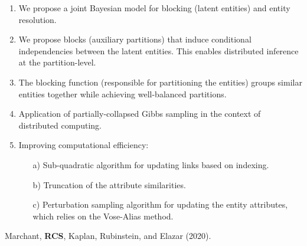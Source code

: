 \documentclass[compress]{beamer}
\newcommand{\1}[1]{\mathbb{I}\!\left[#1\right]} %
\theoremstyle{plain}
\begin{document}
{\begin{enumerate}
\item We propose a joint Bayesian model for blocking (latent entities) and entity resolution. 
\item We propose blocks (auxiliary partitions) that
induce conditional independencies between the latent entities. This enables distributed inference at the partition-level.
\item The blocking function (responsible for partitioning the entities) groups similar entities together while achieving well-balanced partitions.
\item Application of partially-collapsed Gibbs sampling in the context of distributed computing.
\item Improving computational efficiency:
\begin{enumerate}
\item[a)] Sub-quadratic algorithm for updating links based on indexing.
\item[b)] Truncation of the attribute similarities.
\item[c)] Perturbation sampling algorithm for updating the entity attributes, which relies on the Vose-Alias method.
\end{enumerate}
\end{enumerate}

Marchant, \textbf{RCS}, Kaplan, Rubinstein, and Elazar (2020).
}
\end{document}

